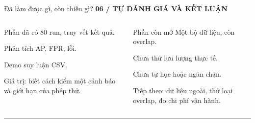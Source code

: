 \documentclass[17pt,aspectratio=169]{beamer}
\newcommand{\eyebrow}[1]{{\small\color{green}\bfseries #1}\par\vspace{2mm}}
\newcommand{\takeaway}[1]{\vfill{\color{green}\rule{\linewidth}{.5pt}}\par\vspace{1mm}{\small #1}}
\begin{document}
\begin{frame}{Đã làm được gì, còn thiếu gì?}
\eyebrow{06 / TỰ ĐÁNH GIÁ VÀ KẾT LUẬN}
\begin{columns}[T,onlytextwidth]
\begin{column}{.47\textwidth}
\begin{block}{Phần đã có}
80 run, truy vết kết quả.\par
Phân tích AP, FPR, lỗi.\par
Demo suy luận CSV.
\end{block}
{\small Giá trị: biết cách kiểm một cảnh báo và giới hạn của phép thử.}
\end{column}
\begin{column}{.49\textwidth}
\begin{block}{Phần còn mở}
Một bộ dữ liệu, còn overlap.\par
Chưa thử lưu lượng thực tế.\par
Chưa tự học hoặc ngăn chặn.
\end{block}
{\small Tiếp theo: dữ liệu ngoài, thử loại overlap, đo chi phí vận hành.}
\end{column}
\end{columns}
\takeaway{Kết luận: kết quả tốt trên benchmark cần đọc cùng phạm vi và chi phí cảnh báo nhầm trước khi triển khai thực tế.}
\end{frame}
\end{document}
